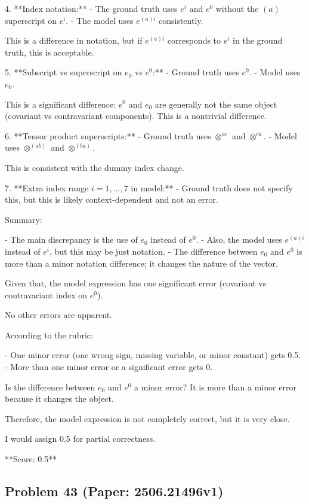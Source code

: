 \documentclass[10pt]{article}
\begin{document}
4. **Index notation:**
   - The ground truth uses \( e^i \) and \( e^0 \) without the \((a)\) superscript on \( e^i \).
   - The model uses \( e^{(a)i} \) consistently.

   This is a difference in notation, but if \( e^{(a)i} \) corresponds to \( e^i \) in the ground truth, this is acceptable.

5. **Subscript vs superscript on \( e_0 \) vs \( e^0 \):**
   - Ground truth uses \( e^0 \).
   - Model uses \( e_0 \).

   This is a significant difference: \( e^0 \) and \( e_0 \) are generally not the same object (covariant vs contravariant components). This is a nontrivial difference.

6. **Tensor product superscripts:**
   - Ground truth uses \(\otimes^{ac}\) and \(\otimes^{ca}\).
   - Model uses \(\otimes^{(ab)}\) and \(\otimes^{(ba)}\).

   This is consistent with the dummy index change.

7. **Extra index range \( i=1,\ldots,7 \) in model:**
   - Ground truth does not specify this, but this is likely context-dependent and not an error.

Summary:

- The main discrepancy is the use of \( e_0 \) instead of \( e^0 \).
- Also, the model uses \( e^{(a)i} \) instead of \( e^i \), but this may be just notation.
- The difference between \( e_0 \) and \( e^0 \) is more than a minor notation difference; it changes the nature of the vector.

Given that, the model expression has one significant error (covariant vs contravariant index on \( e^0 \)).

No other errors are apparent.

According to the rubric:

- One minor error (one wrong sign, missing variable, or minor constant) gets 0.5.
- More than one minor error or a significant error gets 0.

Is the difference between \( e_0 \) and \( e^0 \) a minor error? It is more than a minor error because it changes the object.

Therefore, the model expression is not completely correct, but it is very close.

I would assign 0.5 for partial correctness.

**Score: 0.5**

\newpage
\subsection*{Problem 43 (Paper: 2506.21496v1)}
\end{document}
